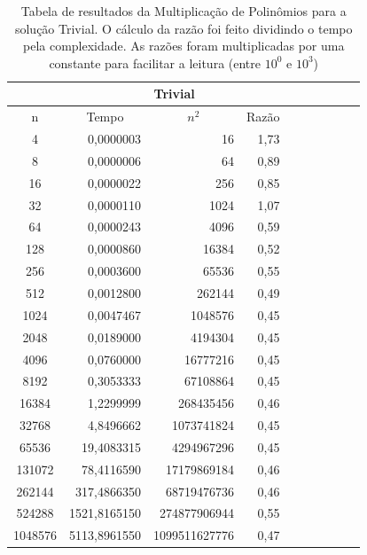 \documentclass[
	12pt,				%
	oneside,			%
	a4paper,			%
	english,			%
	french,				%
	spanish,			%
	brazil,				%
	]{abntex2}
\begin{document}
\begin{table}[H]
  \centering    
  \begin{tabular}{|c|r|r|r|r|r|r|r|r|r|}
    \toprule
    \multicolumn{1}{|c|}{\cellcolor{gray!25}\textbf{}} &
    \multicolumn{3}{|c|}{\cellcolor{gray!25}\textbf{Trivial}} \\
    \midrule
    \multicolumn{1}{|c|}{\cellcolor{gray!10}n} &
    \multicolumn{1}{|c|}{\cellcolor{gray!10}Tempo} &
    \multicolumn{1}{|c|}{\cellcolor{gray!10}$n^2$} &
    \multicolumn{1}{|c|}{\cellcolor{gray!10}Razão} \\
    4	&	0,0000003	&	16	&	1,73	 \\ \hline
    8	&	0,0000006	&	64	&	0,89	 \\ \hline
    16	&	0,0000022	&	256	&	0,85	 \\ \hline
    32	&	0,0000110	&	1024	&	1,07	 \\ \hline
    64	&	0,0000243	&	4096	&	0,59	 \\ \hline
    128	&	0,0000860	&	16384	&	0,52	 \\ \hline
    256	&	0,0003600	&	65536	&	0,55	 \\ \hline
    512	&	0,0012800	&	262144	&	0,49	 \\ \hline
    1024	&	0,0047467	&	1048576	&	0,45	 \\ \hline
    2048	&	0,0189000	&	4194304	&	0,45	 \\ \hline
    4096	&	0,0760000	&	16777216	&	0,45	 \\ \hline
    8192	&	0,3053333	&	67108864	&	0,45	 \\ \hline
    16384	&	1,2299999	&	268435456	&	0,46	 \\ \hline
    32768	&	4,8496662	&	1073741824	&	0,45	 \\ \hline
    65536	&	19,4083315	&	4294967296	&	0,45	 \\ \hline
    131072	&	78,4116590	&	17179869184	&	0,46	 \\ \hline
    262144	&	317,4866350	&	68719476736	&	0,46	 \\ \hline
    524288	&	1521,8165150	&	274877906944	&	0,55	 \\ \hline
    1048576	&	5113,8961550	&	1099511627776	&	0,47	 \\ \hline

  \end{tabular}
  \caption{Tabela de resultados da Multiplicação de Polinômios para a solução Trivial. O cálculo da razão foi feito dividindo o tempo pela complexidade. As razões foram multiplicadas por uma constante para facilitar a leitura (entre $10^0$ e $10^3$)}  
  \label{tab:polymul}
\end{table}
\end{document}
